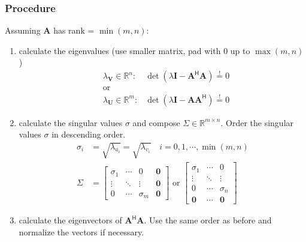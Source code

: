 \subsubsection{Procedure}
Assuming $\mathbf{A}$ has rank = $\min(m,n)$:
\begin{enumerate}
    \item calculate the eigenvalues \newline (use smaller matrix, pad with 0 up to $\max(m,n)$)
          \noindent\begin{align*}
               & \lambda_{\mathbf{V}}\in \mathbb{R}^n: & \det\left(\lambda \mathbf{I}-\mathbf{A}^{\mathsf{H}}\mathbf{A}\right)\overset{!}{=}0 \\
               & \text{or}                             &                                                                                      \\
               & \lambda_{\mathbf{U}}\in \mathbb{R}^m: & \det\left(\lambda \mathbf{I}-\mathbf{AA}^{\mathsf{H}}\right)\overset{!}{=}0
          \end{align*}
    \item calculate the singular values $\sigma$ and compose $\Sigma \in \mathbb{R}^{m \times n}$. Order the singular values $\sigma$ in descending order.
          \noindent\begin{align*}
              \sigma_i & = \sqrt{\lambda_{u_i}} = \sqrt{\lambda_{v_i}}\quad i=0,1,\cdots, \min(m,n) \\
              \Sigma   & = \begin{bmatrix}
                               \sigma_1 & \cdots & 0          & \mathbf{0} \\
                               \vdots   & \ddots & \vdots     & \mathbf{0} \\
                               0        & \cdots & \sigma_{m} & \mathbf{0}
                           \end{bmatrix}\text{ or }
              \begin{bmatrix}
                  \sigma_1   & \cdots & 0          \\
                  \vdots     & \ddots & \vdots     \\
                  0          & \cdots & \sigma_{n} \\
                  \mathbf{0} & \cdots & \mathbf{0}
              \end{bmatrix}
          \end{align*}
    \item calculate the eigenvectors of $\mathbf{A}^{\mathsf{H}}\mathbf{A}$. Use the same order as before and normalize the vectors if necessary.

\end{enumerate}

